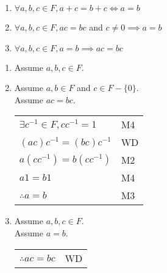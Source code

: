 \documentclass[letterpaper,12pt,fleqn]{article}
\begin{document}
\begin{theorem}
\listbreak
\begin{enumerate}
\item{$\forall a,b,c\in F, a+c=b+c\iff a=b$}
\item{$\forall a,b,c\in F, ac=bc$ and $c\ne0\implies a=b$}
\item{$\forall a,b,c\in F, a=b\implies ac=bc$}
\end{enumerate}
\end{theorem}

\begin{theproof}
\listbreak
\begin{enumerate}
\item Assume $a,b,c\in F$.

\item Assume $a,b\in F$ and $c\in F-\{0\}$.
\\
Assume $ac=bc$.

\begin{tabular}{ll}
$\exists c^{-1}\in F,cc^{-1}=1$ & M4 \\
$(ac)c^{-1}=(bc)c^{-1}$ & WD \\
$a(cc^{-1})=b(cc^{-1})$ & M2 \\
$a1=b1$ & M4 \\
$\therefore a=b$ & M3 \\
\end{tabular}

\item Assume $a,b,c\in F$.
\\
Assume $a=b$.

\begin{tabular}{ll}
$\therefore ac=bc$ & WD \\
\end{tabular}

\end{enumerate}
\end{theproof}
\end{document}
